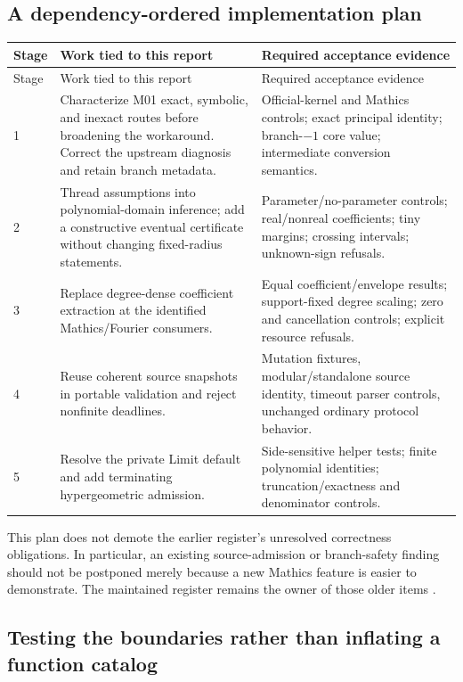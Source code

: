 \documentclass[11pt,a4paper]{article}
\theoremstyle{remark}
\begin{document}
\subsection{A dependency-ordered implementation plan}

\begin{longtable}{@{}L{17mm}L{73mm}L{56mm}@{}}
\toprule
Stage & Work tied to this report & Required acceptance evidence\\\midrule
\endfirsthead
\toprule Stage & Work tied to this report & Required acceptance evidence\\\midrule
{} & Characterize M01 exact, symbolic, and inexact routes before broadening the workaround. Correct the upstream diagnosis and retain branch metadata. & Official-kernel and Mathics controls; exact principal identity; branch-$-1$ core value; intermediate conversion semantics.\\
2 & Thread assumptions into polynomial-domain inference; add a constructive eventual certificate without changing fixed-radius statements. & Parameter/no-parameter controls; real/nonreal coefficients; tiny margins; crossing intervals; unknown-sign refusals.\\
3 & Replace degree-dense coefficient extraction at the identified Mathics/Fourier consumers. & Equal coefficient/envelope results; support-fixed degree scaling; zero and cancellation controls; explicit resource refusals.\\
4 & Reuse coherent source snapshots in portable validation and reject nonfinite deadlines. & Mutation fixtures, modular/standalone source identity, timeout parser controls, unchanged ordinary protocol behavior.\\
5 & Resolve the private Limit default and add terminating hypergeometric admission. & Side-sensitive helper tests; finite polynomial identities; truncation/exactness and denominator controls.\\
\bottomrule
\end{longtable}

This plan does not demote the earlier register's unresolved correctness obligations. In particular, an existing source-admission or branch-safety finding should not be postponed merely because a new Mathics feature is easier to demonstrate. The maintained register remains the owner of those older items \cite{status,intake}.

\subsection{Testing the boundaries rather than inflating a function catalog}
\end{document}
